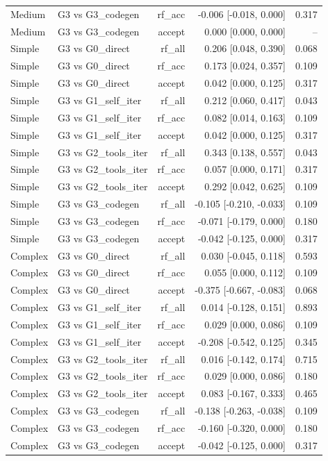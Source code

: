 \begin{tabular}{llrrr}
Medium & G3 vs G3\_codegen & rf\_acc & -0.006 [-0.018, 0.000] & 0.317 \\
Medium & G3 vs G3\_codegen & accept & 0.000 [0.000, 0.000] & -- \\
Simple & G3 vs G0\_direct & rf\_all & 0.206 [0.048, 0.390] & 0.068 \\
Simple & G3 vs G0\_direct & rf\_acc & 0.173 [0.024, 0.357] & 0.109 \\
Simple & G3 vs G0\_direct & accept & 0.042 [0.000, 0.125] & 0.317 \\
Simple & G3 vs G1\_self\_iter & rf\_all & 0.212 [0.060, 0.417] & 0.043 \\
Simple & G3 vs G1\_self\_iter & rf\_acc & 0.082 [0.014, 0.163] & 0.109 \\
Simple & G3 vs G1\_self\_iter & accept & 0.042 [0.000, 0.125] & 0.317 \\
Simple & G3 vs G2\_tools\_iter & rf\_all & 0.343 [0.138, 0.557] & 0.043 \\
Simple & G3 vs G2\_tools\_iter & rf\_acc & 0.057 [0.000, 0.171] & 0.317 \\
Simple & G3 vs G2\_tools\_iter & accept & 0.292 [0.042, 0.625] & 0.109 \\
Simple & G3 vs G3\_codegen & rf\_all & -0.105 [-0.210, -0.033] & 0.109 \\
Simple & G3 vs G3\_codegen & rf\_acc & -0.071 [-0.179, 0.000] & 0.180 \\
Simple & G3 vs G3\_codegen & accept & -0.042 [-0.125, 0.000] & 0.317 \\
Complex & G3 vs G0\_direct & rf\_all & 0.030 [-0.045, 0.118] & 0.593 \\
Complex & G3 vs G0\_direct & rf\_acc & 0.055 [0.000, 0.112] & 0.109 \\
Complex & G3 vs G0\_direct & accept & -0.375 [-0.667, -0.083] & 0.068 \\
Complex & G3 vs G1\_self\_iter & rf\_all & 0.014 [-0.128, 0.151] & 0.893 \\
Complex & G3 vs G1\_self\_iter & rf\_acc & 0.029 [0.000, 0.086] & 0.109 \\
Complex & G3 vs G1\_self\_iter & accept & -0.208 [-0.542, 0.125] & 0.345 \\
Complex & G3 vs G2\_tools\_iter & rf\_all & 0.016 [-0.142, 0.174] & 0.715 \\
Complex & G3 vs G2\_tools\_iter & rf\_acc & 0.029 [0.000, 0.086] & 0.180 \\
Complex & G3 vs G2\_tools\_iter & accept & 0.083 [-0.167, 0.333] & 0.465 \\
Complex & G3 vs G3\_codegen & rf\_all & -0.138 [-0.263, -0.038] & 0.109 \\
Complex & G3 vs G3\_codegen & rf\_acc & -0.160 [-0.320, 0.000] & 0.180 \\
Complex & G3 vs G3\_codegen & accept & -0.042 [-0.125, 0.000] & 0.317 \\
\bottomrule
\end{tabular}
